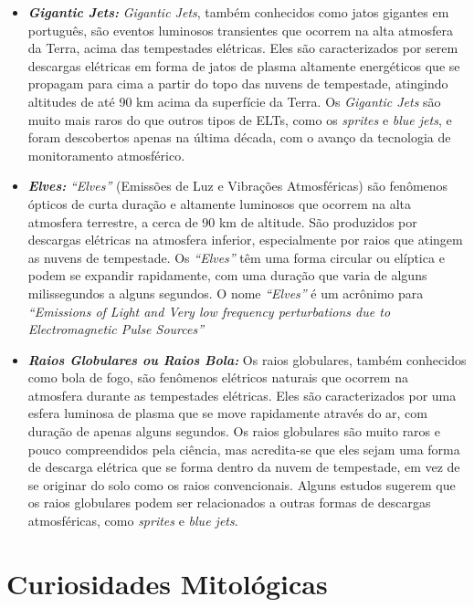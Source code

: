 \documentclass[a4paper, 12pt, onecolumn,singlespacing]{article}
\begin{document}
\begin{itemize}
\begin{itemize}
			\item \textbf{\textit{Gigantic Jets: }}\textit{Gigantic Jets}, também conhecidos como jatos gigantes em português, são eventos luminosos transientes que ocorrem na alta atmosfera da Terra, acima das tempestades elétricas. Eles são caracterizados por serem descargas elétricas em forma de jatos de plasma altamente energéticos que se propagam para cima a partir do topo das nuvens de tempestade, atingindo altitudes de até 90 km acima da superfície da Terra. Os \textit{Gigantic Jets} são muito mais raros do que outros tipos de ELTs, como os \textit{sprites} e \textit{blue jets}, e foram descobertos apenas na última década, com o avanço da tecnologia de monitoramento atmosférico.
			\item \textbf{\textit{Elves: }}\textit{``Elves''} (Emissões de Luz e Vibrações Atmosféricas) são fenômenos ópticos de curta duração e altamente luminosos que ocorrem na alta atmosfera terrestre, a cerca de 90 km de altitude. São produzidos por descargas elétricas na atmosfera inferior, especialmente por raios que atingem as nuvens de tempestade. Os \textit{``Elves''} têm uma forma circular ou elíptica e podem se expandir rapidamente, com uma duração que varia de alguns milissegundos a alguns segundos. O nome \textit{``Elves''} é um acrônimo para \textit{``Emissions of Light and Very low frequency perturbations due to Electromagnetic Pulse Sources''}
			\item \textbf{\textit{Raios Globulares ou Raios Bola: }}Os raios globulares, também conhecidos como bola de fogo, são fenômenos elétricos naturais que ocorrem na atmosfera durante as tempestades elétricas. Eles são caracterizados por uma esfera luminosa de plasma que se move rapidamente através do ar, com duração de apenas alguns segundos. Os raios globulares são muito raros e pouco compreendidos pela ciência, mas acredita-se que eles sejam uma forma de descarga elétrica que se forma dentro da nuvem de tempestade, em vez de se originar do solo como os raios convencionais. Alguns estudos sugerem que os raios globulares podem ser relacionados a outras formas de descargas atmosféricas, como \textit{sprites} e \textit{blue jets}.
		\end{itemize}
		
	\end{itemize}

	\section{Curiosidades Mitológicas}
	
\end{document}
